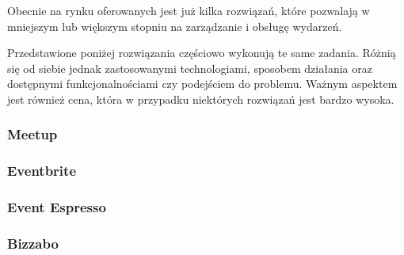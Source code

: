 Obecnie na rynku oferowanych jest już kilka rozwiązań, które pozwalają  w mniejszym lub większym stopniu na zarządzanie i obsługę wydarzeń.

Przedstawione poniżej rozwiązania częściowo wykonują te same zadania. Różnią się od siebie jednak zastosowanymi technologiami, sposobem działania oraz dostępnymi funkcjonalnościami czy podejściem do problemu. Ważnym aspektem jest również cena, która w przypadku niektórych rozwiązań jest bardzo wysoka.

\subsubsection{Meetup}

\subsubsection{Eventbrite}

\subsubsection{Event Espresso}

\subsubsection{Bizzabo}
